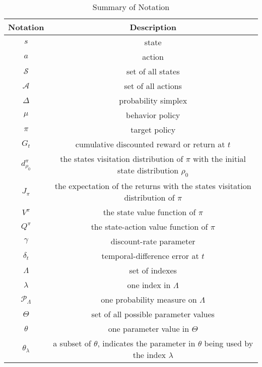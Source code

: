 \begin{table}[!hb]
	\centering
	\caption{Summary of Notation}
	\label{tab: notation}
	\begin{tabular}{|c |c| }
	    \hline
		\textbf{Notation} &\textbf{Description}\\
		\hline
	    $s$ & state \\
	    \hline
	    $a$ & action \\
	    \hline
	    $\mathcal{S} $ & set of all states \\
	    \hline
	    $\mathcal{A} $ & set of all actions \\
	    \hline
	    $\Delta$  & probability simplex \\
	    \hline
	    $\mu $ & behavior policy \\
	    \hline
	    $\pi $ & target policy \\
	    \hline
	    $G_t $ & \makecell[c]{cumulative discounted reward \\ or return at $t$} \\
	    \hline
	    $d_{\rho_0}^{\pi}$  & \makecell[c]{the states visitation distribution of $\pi$ \\ with the initial state distribution 
	    $\rho_0$} \\
	    \hline
	    $J_{\pi}$     & \makecell[c]{the expectation of the returns \\ with the states visitation distribution of $\pi$} \\
	    \hline
	    $V^{\pi}$ & the state value function of $\pi$\\
	    \hline
	    $Q^{\pi}$ &  the state-action value function of $\pi$\\
	    \hline
	    $\gamma$ & discount-rate parameter \\
	    \hline
	    $\delta_{t}$ & temporal-difference error at $t$\\
	    \hline
	    $\Lambda$ & set of indexes  \\
	    \hline
	    $\lambda$ & one index in $\Lambda$ \\
	    \hline
	    $\mathcal{P}_{\Lambda}$ & one probability measure on $\Lambda$ \\
	    \hline
	    $\Theta$  & set of all possible parameter values \\
	    \hline
	    $\theta$  & one parameter value in $\Theta$ \\
	    \hline
	    $\theta_\lambda$ & \makecell[c]{a subset of $\theta$, indicates \\ the parameter in $\theta$ being used by the index $\lambda$} \\

\end{tabular}
\end{table}

